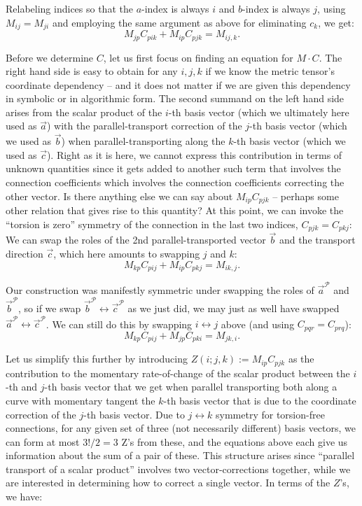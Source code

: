 \documentclass[twocolumn]{article}
\begin{document}
Relabeling indices so that the $a$-index is always $i$ and $b$-index
is always $j$, using $M_{ij}=M_{ji}$ and employing the same argument
as above for eliminating $c_k$, we get:
%
\begin{equation}
M_{jp}C_{pik} + M_{ip}C_{pjk} = M_{ij,k}.
\end{equation}

Before we determine $C$, let us first focus on finding an equation for
$M\cdot C$. The right hand side is easy to obtain for any $i,j,k$ if
we know the metric tensor's coordinate dependency -- and it does not
matter if we are given this dependency in symbolic or in algorithmic
form. The second summand on the left hand side arises from the scalar
product of the $i$-th basis vector (which we ultimately here used as
$\vec a$) with the parallel-transport correction of the $j$-th basis
vector (which we used as $\vec b$) when parallel-transporting along
the $k$-th basis vector (which we used as $\vec c$). Right as it is
here, we cannot express this contribution in terms of unknown
quantities since it gets added to another such term that involves the
connection coefficients which involves the connection coefficients
correcting the other vector. Is there anything else we can say about
$M_{ip}C_{pjk}$ -- perhaps some other relation that gives rise to this
quantity? At this point, we can invoke the ``torsion is zero''
symmetry of the connection in the last two indices, $C_{pjk}=C_{pkj}$:
We can swap the roles of the 2nd parallel-transported vector $\vec b$
and the transport direction $\vec c$, which here amounts to swapping
$j$ and $k$:
%
\begin{equation}
M_{kp}C_{pij} + M_{ip}C_{pkj} = M_{ik,j}.
\end{equation}

Our construction was manifestly symmetric under swapping the roles of
$\vec a^{\mathcal P}$ and $\vec b^{\mathcal P}$, so if we swap
$\vec b^{\mathcal P}\leftrightarrow \vec c^{\mathcal P}$ as we just did,
we may just as well have swapped
$\vec a^{\mathcal P}\leftrightarrow \vec c^{\mathcal P}$.
We can still do this by swapping $i\leftrightarrow j$ above
(and using $C_{pqr}=C_{prq}$):
%
\begin{equation}
  M_{kp}C_{pij} + M_{jp}C_{pki} = M_{jk,i}.
\end{equation}

Let us simplify this further by introducing $Z(i;j,k):= M_{ip}C_{pjk}$
as the contribution to the momentary rate-of-change of the scalar
product between the $i$-th and $j$-th basis vector that we get when
parallel transporting both along a curve with momentary tangent the
$k$-th basis vector that is due to the coordinate correction of the
$j$-th basis vector. Due to $j\leftrightarrow k$ symmetry for
torsion-free connections, for any given set of three (not necessarily
different) basis vectors, we can form at most $3!/2=3$ Z's from these,
and the equations above each give us information about the sum of a
pair of these. This structure arises since ``parallel transport of a
scalar product'' involves two vector-corrections together, while we
are interested in determining how to correct a single vector. In terms
of the $Z$'s, we have:
\end{document}
